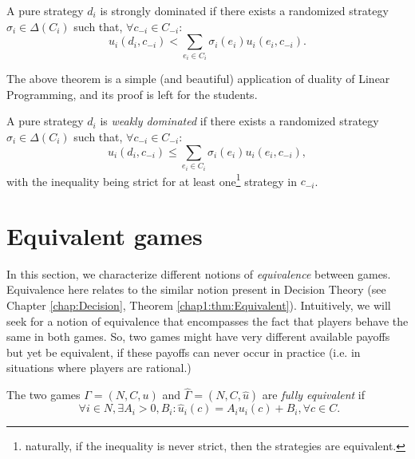 \begin{theorem}
A pure strategy $d_i$ is strongly dominated if there exists a randomized strategy $\sigma_i \in \Delta(C_i)$ such that, $\forall c_{-i} \in C_{-i}$:
\begin{equation}
 u_i(d_i, c_{-i}) < \sum_{e_i \in C_i} \sigma_i(e_i) u_i(e_i, c_{-i}).
 \label{domination}
\end{equation}
\end{theorem}

The above theorem is a simple (and beautiful) application of duality of Linear Programming, and its proof is left for the students.

\begin{definition}
A pure strategy $d_i$ is \emph{weakly dominated} if there exists a randomized strategy $\sigma_i \in \Delta(C_i)$ such that, $\forall c_{-i} \in C_{-i}$:
\begin{equation}
 u_i(d_i, c_{-i}) \leq \sum_{e_i \in C_i} \sigma_i(e_i) u_i(e_i, c_{-i}),
 \label{domination}
\end{equation}
with the inequality being strict for at least one\footnote{naturally, if the inequality is never strict, then the strategies are equivalent.} strategy in $c_{-i}$.
\label{defdomipayoffs}
 \end{definition}


\section{Equivalent games}
\label{chap2:subsec:Equivalences}

In this section, we characterize different notions of \emph{equivalence} between games.  Equivalence here relates to the similar notion present in Decision Theory (see Chapter \ref{chap:Decision}, Theorem \ref{chap1:thm:Equivalent}). Intuitively, we will seek for a notion of equivalence that encompasses the fact that players behave the same in both games. So, two games might have very different available payoffs but yet be equivalent, if these payoffs can never occur in practice (i.e. in situations where players are rational.)

\begin{definition}
The two games $\Gamma = (N, C, u)$ and $\hat \Gamma = (N,C,\hat{u})$ are \emph{fully equivalent} if
$$\,\,\forall i \in N, \exists A_i > 0, B_i : \hat u_i(c) = A_i u_i(c) + B_i, \forall c \in C.$$
\label{chap2:def:fullEquivalence}
\end{definition}

